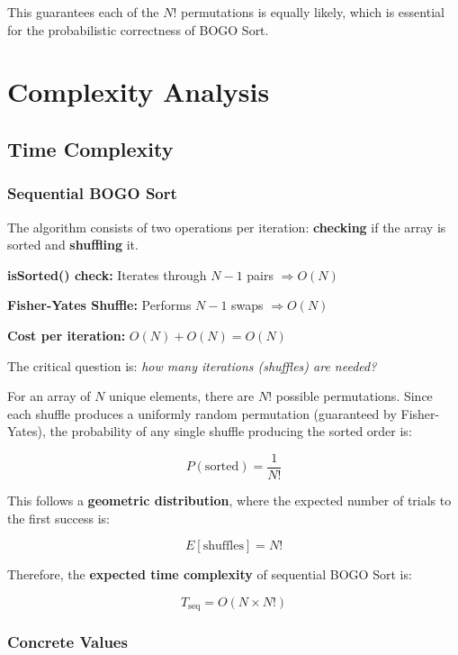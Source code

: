 \documentclass[11pt]{article}
\begin{document}
This guarantees each of the $N!$ permutations is equally likely, which is essential for the probabilistic correctness of BOGO Sort.

\newpage

\section{Complexity Analysis}

\subsection{Time Complexity}

\subsubsection{Sequential BOGO Sort}

The algorithm consists of two operations per iteration: \textbf{checking} if the array is sorted and \textbf{shuffling} it.

\begin{shadedbox}
\textbf{isSorted() check:} Iterates through $N-1$ pairs $\Rightarrow O(N)$

\vspace{4pt}
\textbf{Fisher-Yates Shuffle:} Performs $N-1$ swaps $\Rightarrow O(N)$

\vspace{4pt}
\textbf{Cost per iteration:} $O(N) + O(N) = O(N)$
\end{shadedbox}

The critical question is: \textit{how many iterations (shuffles) are needed?}

For an array of $N$ unique elements, there are $N!$ possible permutations. Since each shuffle produces a uniformly random permutation (guaranteed by Fisher-Yates), the probability of any single shuffle producing the sorted order is:

$$P(\text{sorted}) = \frac{1}{N!}$$

This follows a \textbf{geometric distribution}, where the expected number of trials to the first success is:

$$E[\text{shuffles}] = N!$$

Therefore, the \textbf{expected time complexity} of sequential BOGO Sort is:

$$\boxed{T_{\text{seq}} = O(N \times N!)}$$

\subsubsection{Concrete Values}
\end{document}
